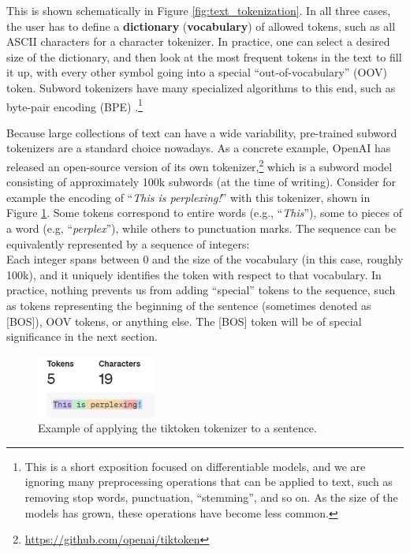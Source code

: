 This is shown schematically in Figure \ref{fig:text_tokenization}. In all three cases, the user has to define a \textbf{dictionary} (\textbf{vocabulary}) of allowed tokens, such as all ASCII characters for a character tokenizer. In practice, one can select a desired size of the dictionary, and then look at the most frequent tokens in the text to fill it up, with every other symbol going into a special “out-of-vocabulary” (OOV) token. Subword tokenizers have many specialized algorithms to this end, such as byte-pair encoding (BPE) \cite{shibata1999byte}.\footnote{This is a short exposition focused on differentiable models, and we are ignoring many preprocessing operations that can be applied to text, such as removing stop words, punctuation, “stemming”, and so on. As the size of the models has grown, these operations have become less common.}

Because large collections of text can have a wide variability, pre-trained subword tokenizers are a standard choice nowadays.  As a concrete example, OpenAI has released an open-source version of its own tokenizer,\footnote{\url{https://github.com/openai/tiktoken}} which is a subword model consisting of approximately 100k subwords (at the time of writing). Consider for example the encoding of “\textit{This is perplexing!}” with this tokenizer, shown in Figure \ref{fig:tiktoken}. Some tokens correspond to entire words (e.g., “\textit{This}”), some to pieces of a word (e.g, “\textit{perplex}”), while others to punctuation marks. The sequence can be equivalently represented by a sequence of integers:
%
\begin{equation}
[2028, 374, 74252, 287, 0]
\label{eq:list_of_indices}
\end{equation}
%
Each integer spans between $0$ and the size of the vocabulary (in this case, roughly 100k), and it uniquely identifies the token with respect to that vocabulary. In practice, nothing prevents us from adding “special” tokens to the sequence, such as tokens representing the beginning of the sentence (sometimes denoted as [BOS]), OOV tokens, or anything else. The [BOS] token will be of special significance in the next section.

\begin{figure}
    \centering
    \hspace{1em}\includegraphics[width=0.35\textwidth]{images/tiktoken}
    \caption{Example of applying the tiktoken tokenizer to a sentence.}
    \label{fig:tiktoken}
\end{figure}

